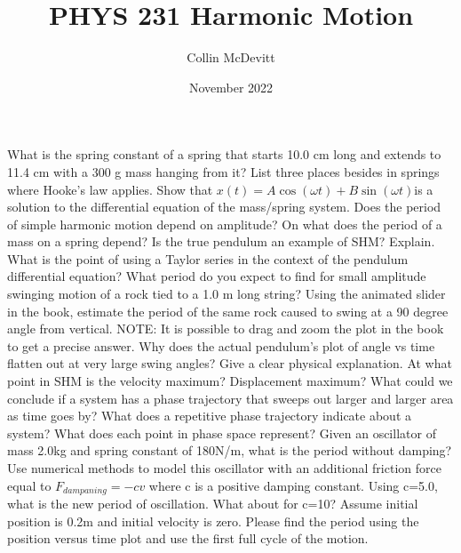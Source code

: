 \documentclass{exam}
\title{PHYS 231 Harmonic Motion}
\author{Collin McDevitt }
\date{November 2022}
\begin{document}
\maketitle


\large

\begin{questions}
\question What is the spring constant of a spring that starts 10.0 cm long and extends to 11.4 cm with a 300 g mass hanging from it? 
\vspace{10mm}
\question List three places besides in springs where Hooke's law applies.
\vspace{10mm}
\question Show that $x(t)= A\cos(\omega t)+ B\sin(\omega t) $is a solution to the differential equation of the mass/spring system.
\vspace{20mm}
\question  Does the period of simple harmonic motion depend on amplitude?  
\vspace{20mm}
\question  On what does the period of a mass on a spring depend?
\vspace{10mm}
 \question  Is the true pendulum an example of SHM?  Explain.
\vspace{15mm}
\question 
What is the point of using a Taylor series in the context of the pendulum differential equation?
\vspace{15mm}
\question What period do you expect to find for small amplitude swinging motion of a rock tied to a 1.0 m long string?
\vspace{15mm}
\question
Using the animated slider in the book, estimate the period of the same rock caused to swing at a 90 degree angle from vertical.  NOTE: It is possible to drag and zoom the plot in the book to get a precise answer.
\vspace{15mm}
\question
Why does the actual pendulum's plot of angle vs time flatten out at very large swing angles?  Give a clear physical explanation.
\vspace{15mm}
\question At what point in SHM is the velocity maximum?  Displacement maximum?
\vspace{15mm}
\question{}
What could we conclude if a system has a phase trajectory that sweeps out larger and larger area as time goes by?
\vspace{15mm}
\question
What does a repetitive phase trajectory indicate about a system?
\vspace{15mm}
\question
What does each point in phase space represent?
\vspace{15mm}
\question Given an oscillator of mass 2.0kg and spring constant of 180N/m, what is the period without damping?  Use numerical methods to model this oscillator with an additional friction force equal to $F_{dampaning} = -cv$ where c is a positive damping constant.  Using c=5.0, what is the new period of oscillation.  What about for c=10? Assume initial position is 0.2m and initial velocity is zero.  Please find the period using the position versus time plot and use the first full cycle of the motion.
\begin{center}
\begin{tikzpicture}
\vspace{5mm}


\end{tikzpicture}
\end{center}
\end{questions}
\end{document}
